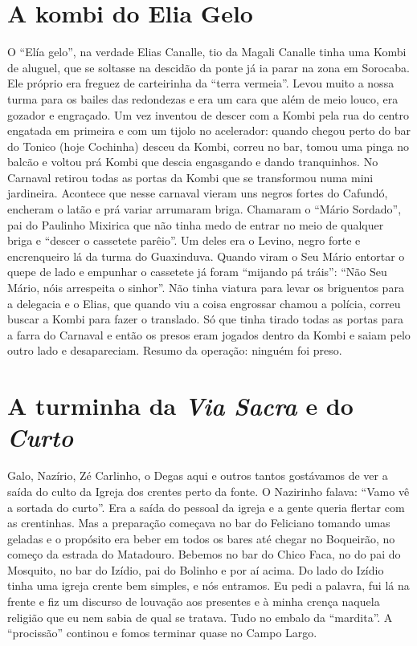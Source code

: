 \documentclass[12pt,brazil,]{book}
\begin{document}
\section{A kombi do Elia Gelo}\label{a-kombi-do-elia-gelo}

O ``Elía gelo'', na verdade Elias Canalle, tio da Magali Canalle tinha
uma Kombi de aluguel, que se soltasse na descidão da ponte já ia parar
na zona em Sorocaba. Ele próprio era freguez de carteirinha da ``terra
vermeia''. Levou muito a nossa turma para os bailes das redondezas e era
um cara que além de meio louco, era gozador e engraçado. Um vez inventou
de descer com a Kombi pela rua do centro engatada em primeira e com um
tijolo no acelerador: quando chegou perto do bar do Tonico (hoje
Cochinha) desceu da Kombi, correu no bar, tomou uma pinga no balcão e
voltou prá Kombi que descia engasgando e dando tranquinhos. No Carnaval
retirou todas as portas da Kombi que se transformou numa mini
jardineira. Acontece que nesse carnaval vieram uns negros fortes do
Cafundó, encheram o latão e prá variar arrumaram briga. Chamaram o
``Mário Sordado'', pai do Paulinho Mixirica que não tinha medo de entrar
no meio de qualquer briga e ``descer o cassetete parêio''. Um deles era
o Levino, negro forte e encrenqueiro lá da turma do Guaxinduva. Quando
viram o Seu Mário entortar o quepe de lado e empunhar o cassetete já
foram ``mijando pá tráis'': ``Não Seu Mário, nóis arrespeita o sinhor''.
Não tinha viatura para levar os briguentos para a delegacia e o Elias,
que quando viu a coisa engrossar chamou a polícia, correu buscar a Kombi
para fazer o translado. Só que tinha tirado todas as portas para a farra
do Carnaval e então os presos eram jogados dentro da Kombi e saiam pelo
outro lado e desapareciam. Resumo da operação: ninguém foi preso.

\section{\texorpdfstring{A turminha da \emph{Via Sacra} e do
\emph{Curto}}{A turminha da Via Sacra e do Curto}}\label{a-turminha-da-via-sacra-e-do-curto}

Galo, Nazírio, Zé Carlinho, o Degas aqui e outros tantos gostávamos de
ver a saída do culto da Igreja dos crentes perto da fonte. O Nazirinho
falava: ``Vamo vê a sortada do curto''. Era a saída do pessoal da igreja
e a gente queria flertar com as crentinhas. Mas a preparação começava no
bar do Feliciano tomando umas geladas e o propósito era beber em todos
os bares até chegar no Boqueirão, no começo da estrada do Matadouro.
Bebemos no bar do Chico Faca, no do pai do Mosquito, no bar do Izídio,
pai do Bolinho e por aí acima. Do lado do Izídio tinha uma igreja crente
bem simples, e nós entramos. Eu pedi a palavra, fui lá na frente e fiz
um discurso de louvação aos presentes e à minha crença naquela religião
que eu nem sabia de qual se tratava. Tudo no embalo da ``mardita''. A
``procissão'' continou e fomos terminar quase no Campo Largo.
\end{document}
